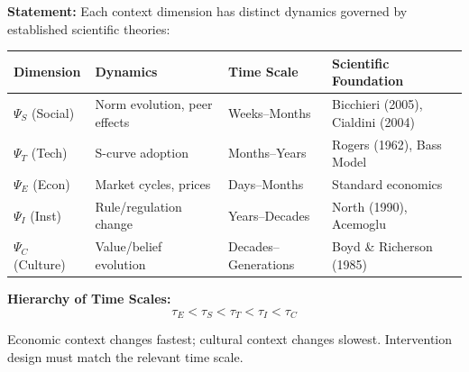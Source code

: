\documentclass[11pt, a4paper]{article}
\begin{document}
\begin{tcolorbox}[colback=cyan!5!white, colframe=cyan!75!black,
    title=\textbf{Axiom NTM-A3: Context Dimension Taxonomy}]

\textbf{Statement:} Each context dimension has distinct dynamics governed by established scientific theories:

\vspace{0.5em}
\begin{center}
\renewcommand{\arraystretch}{1.4}
\begin{tabular}{@{}p{1.8cm}p{3.5cm}p{2.5cm}p{3.5cm}@{}}
\toprule
\textbf{Dimension} & \textbf{Dynamics} & \textbf{Time Scale} & \textbf{Scientific Foundation} \\
\midrule
$\Psi_S$ (Social) & Norm evolution, peer effects & Weeks--Months & Bicchieri (2005), Cialdini (2004) \\
$\Psi_T$ (Tech) & S-curve adoption & Months--Years & Rogers (1962), Bass Model \\
$\Psi_E$ (Econ) & Market cycles, prices & Days--Months & Standard economics \\
$\Psi_I$ (Inst) & Rule/regulation change & Years--Decades & North (1990), Acemoglu \\
$\Psi_C$ (Culture) & Value/belief evolution & Decades--Generations & Boyd \& Richerson (1985) \\
\bottomrule
\end{tabular}
\end{center}

\textbf{Hierarchy of Time Scales:}
\begin{equation}
\tau_E < \tau_S < \tau_T < \tau_I < \tau_C
\end{equation}

Economic context changes fastest; cultural context changes slowest. Intervention design must match the relevant time scale.

\end{tcolorbox}
\end{document}
